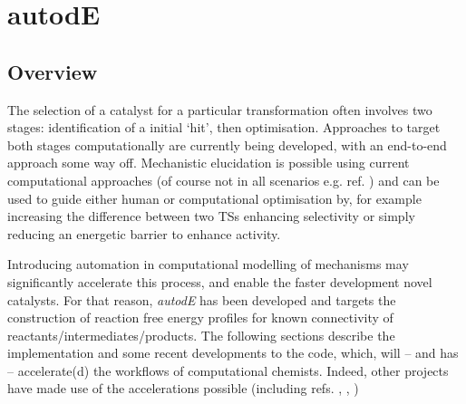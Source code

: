 \documentclass[../../main.tex]{subfiles}
\begin{document}
\setcounter{footnote}{0} 


\chapter{autodE}

\section{Overview}

The selection of a catalyst for a particular transformation often involves two stages: identification of a initial `hit', then optimisation. Approaches to target both stages computationally are currently being developed, with an end-to-end approach some way off. Mechanistic elucidation is possible using current computational approaches (of course not in all scenarios e.g. ref. \cite{Plata2015}) and can be used to guide either human or computational optimisation by, for example increasing the difference between two TSs enhancing selectivity or simply reducing an energetic barrier to enhance activity.

Introducing automation in computational modelling of mechanisms may significantly accelerate this process, and enable the faster development novel catalysts. For that reason, \emph{autodE} has been developed and targets the construction of reaction free energy profiles for known connectivity of reactants/intermediates/products. The following sections describe the implementation and some recent developments to the code, which, will -- and has -- accelerate(d) the workflows of computational chemists. Indeed, other projects have made use of the accelerations possible (including refs. \cite{Wang2020}, \cite{Branfoot2021}, \cite{Young2021GAP})


\clearpage
\end{document}
